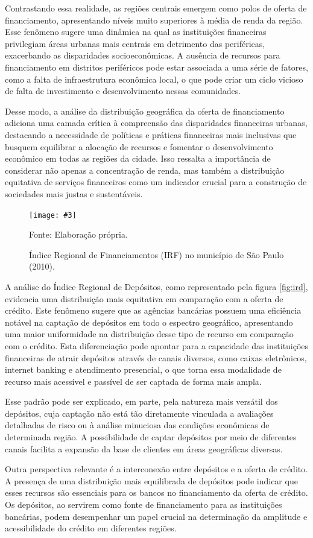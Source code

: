 \documentclass[a4paper,12pt]{article}
\newcommand{\fig}[4]{%
  \begin{figure}[H]
    \centering
    \caption{#1}
    \label{#2}
    \texttt{[image: \#3]}
    
    \vspace{0.5cm}
    
    \begin{footnotesize}
      Fonte: #4
    \end{footnotesize}
  \end{figure}
}
\begin{document}
Contrastando essa realidade, as regiões centrais emergem como polos de
oferta de financiamento, apresentando níveis muito superiores à média de
renda da região. Esse fenômeno sugere uma dinâmica na qual as
instituições financeiras privilegiam áreas urbanas mais centrais em
detrimento das periféricas, exacerbando as disparidades socioeconômicas.
A ausência de recursos para financiamento em distritos periféricos pode
estar associada a uma série de fatores, como a falta de infraestrutura
econômica local, o que pode criar um ciclo vicioso de falta de
investimento e desenvolvimento nessas comunidades.

Desse modo, a análise da distribuição geográfica da oferta de
financiamento adiciona uma camada crítica à compreensão das disparidades
financeiras urbanas, destacando a necessidade de políticas e práticas
financeiras mais inclusivas que busquem equilibrar a alocação de
recursos e fomentar o desenvolvimento econômico em todas as regiões da
cidade. Isso ressalta a importância de considerar não apenas a
concentração de renda, mas também a distribuição equitativa de serviços
financeiros como um indicador crucial para a construção de sociedades
mais justas e sustentáveis.

\fig{Índice Regional de Financiamentos (IRF) no município de São Paulo (2010).}{fig:irf}{exports/irf2.pdf}{Elaboração própria.}

A análise do Índice Regional de Depósitos, como representado pela figura
\ref{fig:ird}, evidencia uma distribuição mais equitativa em comparação
com a oferta de crédito. Este fenômeno sugere que as agências bancárias
possuem uma eficiência notável na captação de depósitos em todo o
espectro geográfico, apresentando uma maior uniformidade na distribuição
desse tipo de recurso em comparação com o crédito. Esta diferenciação
pode apontar para a capacidade das instituições financeiras de atrair
depósitos através de canais diversos, como caixas eletrônicos, internet
banking e atendimento presencial, o que torna essa modalidade de recurso
mais acessível e passível de ser captada de forma mais ampla.

Esse padrão pode ser explicado, em parte, pela natureza mais versátil
dos depósitos, cuja captação não está tão diretamente vinculada a
avaliações detalhadas de risco ou à análise minuciosa das condições
econômicas de determinada região. A possibilidade de captar depósitos
por meio de diferentes canais facilita a expansão da base de clientes em
áreas geográficas diversas.

Outra perspectiva relevante é a interconexão entre depósitos e a oferta
de crédito. A presença de uma distribuição mais equilibrada de depósitos
pode indicar que esses recursos são essenciais para os bancos no
financiamento da oferta de crédito. Os depósitos, ao servirem como fonte
de financiamento para as instituições bancárias, podem desempenhar um
papel crucial na determinação da amplitude e acessibilidade do crédito
em diferentes regiões.
\end{document}
